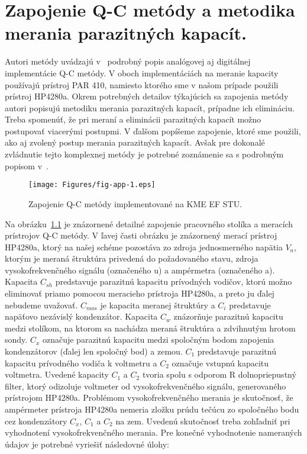 
\chapter{Zapojenie Q-C metódy a metodika merania parazitných kapacít.}\label{app:AppendixE}

Autori metódy uvádzajú v~\cite{App.2, App.3, App.4} podrobný popis
analógovej aj digitálnej implementácie Q-C metódy.  V oboch
implementáciách na meranie kapacity používajú prístroj PAR 410,
namiesto ktorého sme v našom prípade použili prístroj HP4280a. Okrem
potrebných detailov týkajúcich sa zapojenia metódy autori popisujú
metodiku merania parazitných kapacít, prípadne ich elimináciu. Treba
spomenúť, že pri meraní a eliminácii parazitných kapacít možno
postupovať viacerými postupmi. V ďalšom popíšeme zapojenie, ktoré sme
použili, ako aj zvolený postup merania parazitných kapacít. Avšak pre
dokonalé zvládnutie tejto komplexnej metódy je potrebné zoznámenie sa
s podrobným popisom v~\cite{App.2, App.3, App.4}.

\begin{figure}[h!]\centering
  \texttt{[image: Figures/fig-app-1.eps]}
  \caption[Zapojenie Q-C metódy implementované na KME EF
    STU.]{Zapojenie Q-C metódy implementované na KME EF
    STU.}\label{fig:App.1}
\end{figure}

\par Na obrázku~\ref{fig:App.1} je znázornené detailné zapojenie
pracovného stolíka a meracích prístrojov Q-C metódy. V ľavej časti
obrázku je znázornený merací prístroj HP4280a, ktorý na našej schéme
pozostáva zo zdroja jednosmerného napätia $V_a$, ktorým je meraná
štruktúra privedená do požadovaného stavu, zdroja vysokofrekvenčného
signálu (označeného u) a ampérmetra (označeného a).  Kapacita $C_{sh}$
predstavuje parazitnú kapacitu prívodných vodičov, ktorú možno
eliminovať priamo pomocou meracieho prístroja HP4280a, a preto ju
ďalej nebudeme uvažovať. $C_{mos}$ je kapacita meranej štruktúry a
$C_i$ predstavuje napäťovo nezávislý kondenzátor. Kapacita $C_w$
znázorňuje parazitnú kapacitu medzi stolíkom, na ktorom sa nachádza
meraná štruktúra a zdvihnutým hrotom sondy. $C_x$ označuje parazitnú
kapacitu medzi spoločným bodom zapojenia kondenzátorov (ďalej len
spoločný bod) a zemou.  $C_1$ predstavuje parazitnú kapacitu
prívodného vodiča k voltmetru a $C_2$ označuje vstupnú kapacitu
voltmetra.  Uvedené kapacity $C_1$ a $C_2$ tvoria spolu s odporom R
dolnopriepustný filter, ktorý odizoluje voltmeter od
vysokofrekvenčného signálu, generovaného prístrojom HP4280a. Problémom
vysokofrekvenčného merania je skutočnosť, že ampérmeter prístroja
HP4280a nemeria zložku prúdu tečúcu zo spoločného bodu cez
kondenzátory $C_x$, $C_1$ a $C_2$ na zem. Uvedenú skutočnosť treba
zohľadniť pri vyhodnotení vysokofrekvenčného merania. Pre konečné
vyhodnotenie nameraných údajov je potrebné vyriešiť následovné úlohy:


